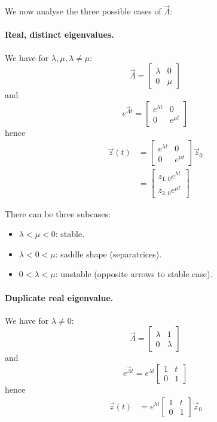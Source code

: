 We now analyse the three possible cases of $\vec \Lambda$:

\paragraph{Real, distinct eigenvalues.} We have for $\lambda, \mu, \lambda \neq \mu$:
\begin{equation*}
	\vec \Lambda = 
	\begin{bmatrix}
		\lambda & 0 \\
		0 & \mu
	\end{bmatrix}
\end{equation*}
and
\begin{equation*}
	e^{\vec \Lambda t} =
		\begin{bmatrix}
			e^{\lambda t}	& 0 \\
			0 				& e^{\mu t}
		\end{bmatrix}
\end{equation*}
hence
\begin{align*}
	\vec z(t) 	&= 
		\begin{bmatrix}
			e^{\lambda t}	& 0 \\
			0 				& e^{\mu t}
		\end{bmatrix}
		\vec z_0 \\
				&= 
		\begin{bmatrix}
			z_{1, 0} e^{\lambda t} \\
			z_{2, 0} e^{\mu t}
		\end{bmatrix}
\end{align*}

There can be three subcases:
\begin{itemize}
	\item $\lambda < \mu < 0$: stable.
	\item $\lambda < 0 < \mu$: saddle shape (separatrices).
	\item $0 < \lambda < \mu$: unstable (opposite arrows to stable case).
\end{itemize}

\paragraph{Duplicate real eigenvalue.} We have for $\lambda \neq 0$:
\begin{equation*}
	\vec \Lambda = 
	\begin{bmatrix}
		\lambda & 1 \\
		0 & \lambda
	\end{bmatrix}
\end{equation*}
and
\begin{equation*}
	e^{\vec \Lambda t} = 
		e^{\lambda t}
		\begin{bmatrix}
			1 	& t \\
			0 	& 1
		\end{bmatrix}
\end{equation*}
hence
\begin{align*}
	\vec z(t) 	&= 
		e^{\lambda t}
		\begin{bmatrix}
			1 	& t \\
			0 	& 1
		\end{bmatrix}
		\vec z_0
\end{align*}

